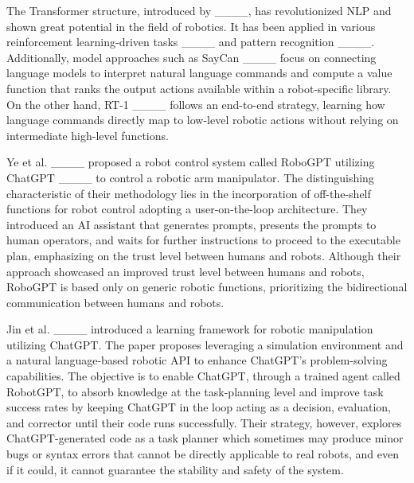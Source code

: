 The Transformer structure, introduced by ____, has revolutionized NLP and shown great potential in the field of robotics. It has been applied in various reinforcement learning-driven tasks ____ and pattern recognition ____. Additionally, model approaches such as SayCan ____ focus on connecting language models to interpret natural language commands and compute a value function that ranks the output actions available within a robot-specific library. On the other hand, RT-1 ____ follows an end-to-end strategy, learning how language commands directly map to low-level robotic actions without relying on intermediate high-level functions.

Ye et al. ____ proposed a robot control system called RoboGPT utilizing ChatGPT ____ to control a robotic arm manipulator. The distinguishing characteristic of their methodology lies in the incorporation of off-the-shelf functions for robot control adopting a user-on-the-loop architecture. They introduced an AI assistant that generates prompts, presents the prompts to human operators, and waits for further instructions to proceed to the executable plan, emphasizing on the trust level between humans and robots. Although their approach showcased an improved trust level between humans and robots, RoboGPT is based only on generic robotic functions, prioritizing the bidirectional communication between humans and robots.

Jin et al. ____ introduced a learning framework for robotic manipulation utilizing ChatGPT. The paper proposes leveraging a simulation environment and a natural language-based robotic API to enhance ChatGPT's problem-solving capabilities. The objective is to enable ChatGPT, through a trained agent called RobotGPT, to absorb knowledge at the task-planning level and improve task success rates by keeping ChatGPT in the loop acting as a decision, evaluation, and corrector until their code runs successfully. Their strategy, however, explores ChatGPT-generated code as a task planner which sometimes may produce minor bugs or syntax errors that cannot be directly applicable to real robots, and even if it could, it cannot guarantee the stability and safety of the system.

